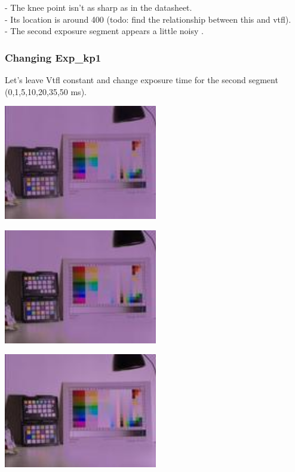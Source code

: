 - The knee point isn't as sharp as in the datasheet.\\
- Its location is around 400 (todo: find the relationship between this and vtfl).\\
- The second exposure segment appears a little noisy .\\

\subsubsection{Changing Exp\_kp1}

Let's leave Vtfl constant and change exposure time for the second segment (0,1,5,10,20,35,50 ms). 

\begin{center}
\includegraphics[height=5cm]{images/100ms-0ms-32-tiny}
\end{center}

\begin{center}
\includegraphics[height=5cm]{images/100ms-1ms-32-tiny}
\end{center}

\begin{center}
\includegraphics[height=5cm]{images/100ms-5ms-32-tiny}
\end{center}


